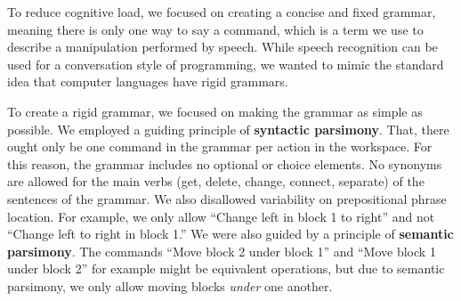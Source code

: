 \documentclass[]{article}
\begin{document}

To reduce cognitive load, we focused on creating a concise and fixed grammar, 
meaning there is only one way to say a command, which is a term we use to 
describe a manipulation performed by speech. While speech recognition can be 
used for a conversation style of programming, we wanted to mimic the standard 
idea that computer languages have rigid grammars. 


To create a rigid grammar, we focused on making the grammar as simple as
possible. We employed a guiding principle of \textbf{syntactic parsimony}. That,
there ought only be one command in the grammar per action in the workspace. For
this reason, the grammar includes no optional or choice elements. No synonyms
are allowed for the main verbs (get, delete, change, connect, separate) of the
sentences of the grammar. We also disallowed variability on prepositional phrase
location. For example, we only allow ``Change left in block 1 to right'' and not
``Change left to right in block 1.'' We were also guided by a principle of
\textbf{semantic parsimony}. The commands ``Move block 2 under block 1'' and
``Move block 1 under block 2'' for example might be equivalent operations, but
due to semantic parsimony, we only allow moving blocks \emph{under} one another.

\end{document}
